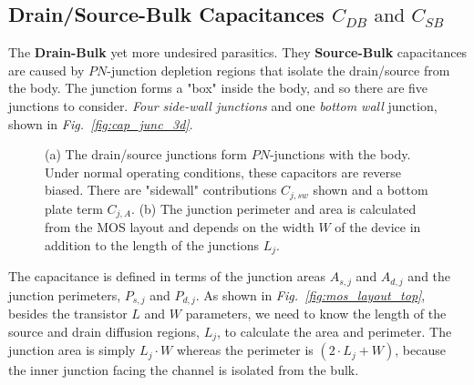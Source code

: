\subsection{Drain/Source-Bulk Capacitances \texorpdfstring{$C_{DB}\text{ and }C_{SB}$}{}}
The \textbf{Drain-Bulk} yet more undesired parasitics.  They \textbf{Source-Bulk} capacitances are caused by $PN$-junction depletion regions that isolate the drain/source from the body. The junction forms a "box" inside the body, and so there are five junctions to consider. \textit{Four side-wall junctions} and one \textit{bottom wall} junction, shown in \emph{Fig.~\ref{fig:cap_junc_3d}}.
\begin{figure}[H]
\centering
{}
\hspace{0.75cm}
\caption{(a) The drain/source junctions form $PN$-junctions with the body.  Under normal operating conditions, these capacitors are reverse biased.  There are "sidewall" contributions $C_{j,sw}$ shown and a bottom plate term $C_{j,A}$.  (b)  The junction perimeter and area is calculated from the MOS layout and depends on the width $W$ of the device in addition to the length of the junctions $L_j$.} 
\end{figure}
\newpage
The capacitance is defined in terms of the junction areas $A_{s,j}$ and $A_{d,j}$ and the junction perimeters, $P_{s,j}$ and $P_{d,j}$.  As shown in  \emph{Fig.~\ref{fig:mos_layout_top}}, besides the transistor $L$ and $W$ parameters, we need to know the length of the source and drain diffusion regions, $L_j$, to calculate the area and perimeter.  The junction area is simply $L_j \cdot W$ whereas the perimeter is $(2\cdot L_j + W)$, because the inner junction facing the channel is isolated from the bulk.
